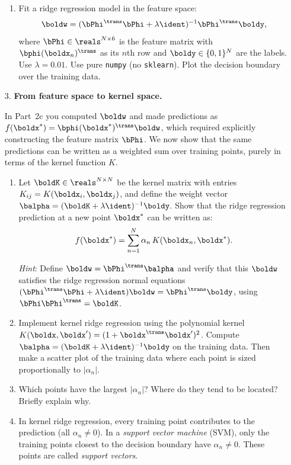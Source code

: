 \documentclass[submit]{../harvardml}
\begin{document}
\begin{problem}
\begin{enumerate}
\begin{enumerate}
    \item Fit a ridge regression model in the feature space:
    \[
      \boldw = (\bPhi^\trans \bPhi + \lambda \ident)^{-1} \bPhi^\trans \boldy,
    \]
    where $\bPhi \in \reals^{N \times 6}$ is the feature matrix with
    $\bphi(\boldx_n)^\trans$ as its $n$th row and $\boldy \in \{0, 1\}^N$
    are the labels. Use $\lambda = 0.01$. Use pure \texttt{numpy} (no \texttt{sklearn}).
    Plot the decision boundary over the training data.
  \end{enumerate}

  \item[3.] \textbf{From feature space to kernel space.}

  In Part~2c you computed $\boldw$ and made predictions as
  $f(\boldx^*) = \bphi(\boldx^*)^\trans \boldw$, which required
  explicitly constructing the feature matrix $\bPhi$. We now show that
  the same predictions can be written as a weighted sum over training
  points, purely in terms of the kernel function $K$.

  \begin{enumerate}
    \item Let $\boldK \in \reals^{N \times N}$ be the kernel matrix
    with entries $K_{ij} = K(\boldx_i, \boldx_j)$, and define
    the weight vector
    $\balpha = (\boldK + \lambda \ident)^{-1} \boldy$.
    Show that the ridge regression prediction at a new point $\boldx^*$
    can be written as:
    \[
      f(\boldx^*) = \sum_{n=1}^{N} \alpha_n \, K(\boldx_n, \boldx^*).
    \]

    \textit{Hint}: Define $\boldw = \bPhi^\trans \balpha$ and verify
    that this $\boldw$ satisfies the ridge regression normal equations
    $(\bPhi^\trans \bPhi + \lambda \ident)\boldw = \bPhi^\trans \boldy$,
    using $\bPhi \bPhi^\trans = \boldK$.

    \item Implement kernel ridge regression using the polynomial kernel
    $K(\boldx, \boldx') = (1 + \boldx^\trans \boldx')^2$. Compute
    $\balpha = (\boldK + \lambda \ident)^{-1} \boldy$ on the
    training data. Then make a scatter plot of the training data where
    each point is sized proportionally to $|\alpha_n|$.

    \item Which points have the largest $|\alpha_n|$? Where do they tend
    to be located? Briefly explain why.

    \item In kernel ridge regression, every training point contributes to
    the prediction (all $\alpha_n \neq 0$). In a \emph{support vector
    machine} (SVM), only the training points closest to the decision
    boundary have $\alpha_n \neq 0$. These points are called
    \emph{support vectors}.


\end{enumerate}
\end{enumerate}
\end{problem}
\end{document}
